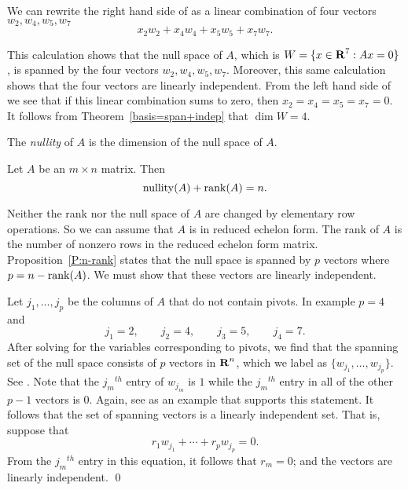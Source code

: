 \noindent We can rewrite the right hand side of 
as a linear combination of four
vectors $w_2,w_4,w_5,w_7$
\begin{equation}   \label{e:w'scomb}
x_2w_2 + x_4w_4 + x_5w_5 + x_7w_7.
\end{equation}

This calculation shows that the null space of $A$, which is
$W=\{x\in\mbox{$\bf{R}$}^7:Ax=0\}$, is spanned by the four vectors
$w_2,w_4,w_5,w_7$.  Moreover, this same calculation shows that
the four vectors  are linearly independent.
From the left hand side of  we see that if this
linear combination sums to zero, then $x_2=x_4=x_5=x_7=0$.  It
follows from Theorem~\ref{basis=span+indep} that $\dim W = 4$.

\begin{Def}  \label{D:nullity}
The {\em nullity\/} of $A$ is the dimension of the null space of $A$.
\end{Def} 

\begin{thm}  \label{T:dimsoln}
Let $A$ be an $m\times n$ matrix. Then
\[
{\rm nullity}(A) + {\rm rank}(A) = n.
\]
\end{thm} 

\proof	Neither the rank nor the null space of $A$ are changed by
elementary row operations.  So we can assume that $A$ is in reduced
echelon form.  The rank of $A$ is the number of nonzero rows in
the reduced echelon form matrix.  Proposition~\ref{P:n-rank} states that
the null space is spanned by $p$ vectors where $p=n-{\rm rank}(A)$.  We
must show that these vectors are linearly independent.

Let $j_1,\ldots,j_p$ be the columns of $A$ that do not contain pivots.
In example  $p=4$ and
\[
j_1 = 2, \qquad j_2 = 4, \qquad j_3 = 5, \qquad j_4 = 7.
\]
After solving for the variables corresponding to pivots, we find that
the spanning set of the null space consists of $p$ vectors in $\mbox{$\bf{R}$}^n$,
which we label as $\{w_{j_1},\ldots,w_{j_p}\}$.  See .
Note that the $j_m$$^{th}$  entry of $w_{j_m}$ is $1$ while the
$j_m$$^{th}$ entry in all of the other $p-1$ vectors is $0$.  Again,
see  as an example that supports this statement.  It
follows that the set of spanning vectors is a linearly independent set.
That is, suppose that
\[
r_1w_{j_1} + \cdots + r_pw_{j_p} = 0.
\]
From the $j_m$$^{th}$ entry in this equation, it follows that $r_m=0$;
and the vectors are linearly independent.  \qed

